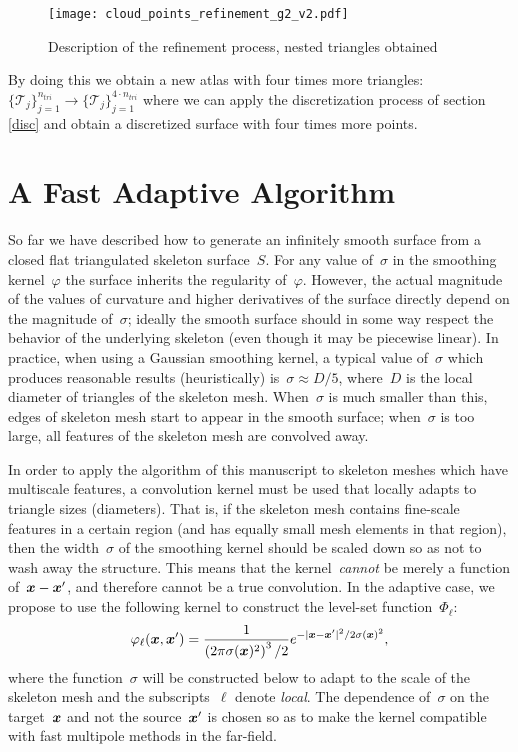 \documentclass[11pt]{article}
\numberwithin{equation}{section}
\newcommand{\vct}{\vectorsym}
\newcommand{\lp}{\left(}
\newcommand{\rp}{\right)}
\newcommand\bx{\vct{x}}
\renewcommand{\phi}{\varphi}
\begin{document}
\begin{figure}[H]
\begin{center}
\texttt{[image: cloud\_points\_refinement\_g2\_v2.pdf]}%
\end{center}
\caption{Description of the refinement process, nested triangles obtained}
\label{refinement3}
\end{figure}


By doing this we obtain a new atlas with four times more triangles:
$\{\mathcal{T}_j\}_{j=1}^{n_{tri}}\rightarrow
\{\mathcal{T}_j\}_{j=1}^{4\cdot n_{tri}}$ where we can apply the
discretization process of section \ref{disc} and obtain a discretized
surface with four times more points.








\section{A Fast Adaptive Algorithm}
\label{sec:fast-adap}

So far we have described how to generate an infinitely smooth surface
from a closed flat triangulated skeleton surface~$S$. For any value
of~$\sigma$ in the smoothing kernel~$\phi$ the surface inherits the
regularity of~$\phi$. However, the actual magnitude of the values of
curvature and higher derivatives of the surface directly depend on the
magnitude of~$\sigma$; ideally the smooth surface should in some way
respect the behavior of the underlying skeleton (even though it may be
piecewise linear). In practice, when using a Gaussian smoothing
kernel, a typical value of~$\sigma$ which produces reasonable results
(heuristically) is~$\sigma \approx D/5$, where~$D$ is the local
diameter of triangles of the skeleton mesh. When~$\sigma$ is much
smaller than this, edges of skeleton mesh start to appear in the
smooth surface; when~$\sigma$ is too large, all features of the
skeleton mesh are convolved away.

In order to apply the algorithm of this manuscript to skeleton meshes
which have multiscale features, a convolution kernel must be used that
locally adapts to triangle sizes (diameters).
That is, if the skeleton mesh contains fine-scale features in a
certain region (and has equally small mesh elements in that region),
then the width~$\sigma$ of the smoothing kernel should be scaled down
so as not to wash away the structure. This means that the
kernel~\emph{cannot} be merely a function of~$\bx-\bx'$, and therefore
cannot be a true convolution.
In the adaptive case,
we propose to use the following kernel to construct the level-set
function~$\Phi_\ell$:
\begin{equation}
  \phi_\ell(\bx,\bx') = \frac{1}{\lp 2\pi \sigma(\bx)^2 \rp^3/2}
  e^{-|\bx-\bx'|^2/2\sigma(\bx)^2},
\end{equation}
where the function~$\sigma$ will be constructed below to adapt to the
scale of the skeleton mesh and the subscripts~$\ell$ denote
\emph{local}. The dependence of~$\sigma$ on the target~$\bx$ and not
the source~$\bx'$ is chosen so as to make the kernel compatible with
fast multipole methods in the far-field.
\end{document}
